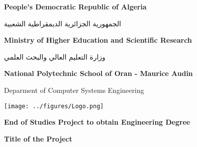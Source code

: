 \begin{titlepage}
  \thispagestyle{empty}
  \begin{center}

  \textbf{People's Democratic Republic of Algeria}

  \vspace{0.2cm}

  \begin{Arabic}
    \large{الجمهورية الجزائرية الديمقراطية الشعبية}
  \end{Arabic}

  \vspace{0.2cm}

  \textbf{Ministry of Higher Education and Scientific Research}

  \vspace{0.2cm}

  \begin{Arabic}
    \large{وزارة التعليم العالي والبحث العلمي}
  \end{Arabic}

  \vspace{0.5cm}
  
  \HRule

  \vspace{1cm}

  \textbf{National Polytechnic School of Oran - Maurice Audin}
  \vspace{0.2cm}

  Deparment of Computer Systems Engineering
  \vspace{0.5cm}

  \texttt{[image: ../figures/Logo.png]}
  
  \vspace{1.5cm}

  \begin{minipage}{0.5\textwidth}
    \begin{center}
      \textbf{End of Studies Project to obtain Engineering Degree}
    \end{center}
  \end{minipage}

  \vspace{1cm}



  \HRule

  \vspace{1cm}

  \begin{minipage}{0.7\textwidth}
    \begin{center}
    \Large\textbf{Title of the Project}
    \end{center}
  \end{minipage}


\end{center}
\end{titlepage}
